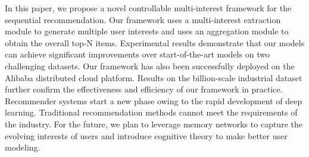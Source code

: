 
In this paper, we propose a novel controllable multi-interest framework for the sequential recommendation. Our framework uses a multi-interest extraction module to generate multiple user interests and uses an aggregation module to obtain the overall top-N items. 
Experimental results demonstrate that our models can achieve significant improvements over start-of-the-art models on two challenging datasets. Our framework has also been successfully deployed on the Alibaba distributed cloud platform. Results on the billion-scale industrial dataset further confirm the effectiveness and efficiency of our framework in practice. Recommender systems start a new phase owing to the rapid development of deep learning. Traditional recommendation methods cannot meet the requirements of the industry. For the future, we plan to leverage memory networks to capture the evolving interests of users and introduce cognitive theory to make better user modeling. 
